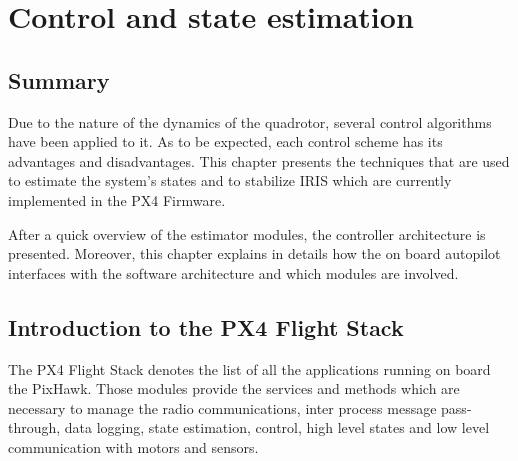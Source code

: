 
\chapter{Control and state estimation}
\label{chap:fifth
}
\ifpdf
    \graphicspath{{Chapter5/Figures/PNG/}{Chapter5/Figures/PDF/}{Chapter5/Figures/}}
\else
    \graphicspath{{Chapter5/Figures/EPS/}{Chapter5/Figures/}}
\fi

\section*{Summary}
Due to the nature of the dynamics of the quadrotor, several control algorithms have been applied to it. As to be expected, each control scheme has its advantages and disadvantages. This chapter presents the techniques that are used to estimate the system's states and to stabilize IRIS which are currently implemented in the PX4 Firmware.\par After a quick overview of the estimator modules, the controller architecture is presented. Moreover, this chapter explains in details how the on board autopilot interfaces with the software architecture and which modules are involved.

\section{Introduction to the PX4 Flight Stack}

The PX4 Flight Stack denotes the list of all the applications running on board the PixHawk. Those modules provide the services and methods which are necessary to manage the radio communications, inter process message pass-through, data logging, state estimation, control, high level states and low level communication with motors and sensors.

